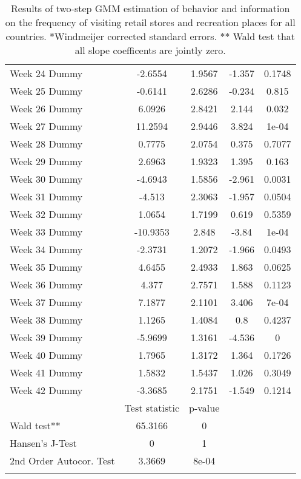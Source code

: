 \begin{longtable}{lcccc}
  Week 24 Dummy & -2.6554 & 1.9567 & -1.357 & 0.1748 \\ 
  Week 25 Dummy & -0.6141 & 2.6286 & -0.234 & 0.815 \\ 
  Week 26 Dummy & 6.0926 & 2.8421 & 2.144 & 0.032 \\ 
  Week 27 Dummy & 11.2594 & 2.9446 & 3.824 & 1e-04 \\ 
  Week 28 Dummy & 0.7775 & 2.0754 & 0.375 & 0.7077 \\ 
  Week 29 Dummy & 2.6963 & 1.9323 & 1.395 & 0.163 \\ 
  Week 30 Dummy & -4.6943 & 1.5856 & -2.961 & 0.0031 \\ 
  Week 31 Dummy & -4.513 & 2.3063 & -1.957 & 0.0504 \\ 
  Week 32 Dummy & 1.0654 & 1.7199 & 0.619 & 0.5359 \\ 
  Week 33 Dummy & -10.9353 & 2.848 & -3.84 & 1e-04 \\ 
  Week 34 Dummy & -2.3731 & 1.2072 & -1.966 & 0.0493 \\ 
  Week 35 Dummy & 4.6455 & 2.4933 & 1.863 & 0.0625 \\ 
  Week 36 Dummy & 4.377 & 2.7571 & 1.588 & 0.1123 \\ 
  Week 37 Dummy & 7.1877 & 2.1101 & 3.406 & 7e-04 \\ 
  Week 38 Dummy & 1.1265 & 1.4084 & 0.8 & 0.4237 \\ 
  Week 39 Dummy & -5.9699 & 1.3161 & -4.536 & 0 \\ 
  Week 40 Dummy & 1.7965 & 1.3172 & 1.364 & 0.1726 \\ 
  Week 41 Dummy & 1.5832 & 1.5437 & 1.026 & 0.3049 \\ 
  Week 42 Dummy & -3.3685 & 2.1751 & -1.549 & 0.1214 \\ 
   & Test statistic & p-value &  &  \\ 
  Wald test** & 65.3166 & 0 &  &  \\ 
  Hansen's J-Test & 0 & 1 &  &  \\ 
  2nd Order Autocor. Test & 3.3669 & 8e-04 &  &  \\ 
   \bottomrule
\caption{Results of two-step GMM estimation of behavior and information on the frequency of visiting retail stores and recreation places for all countries. *Windmeijer corrected standard errors. ** Wald test that all slope coefficents are jointly zero.} 
\label{tab_results:retail_full}
\end{longtable}
\endgroup
